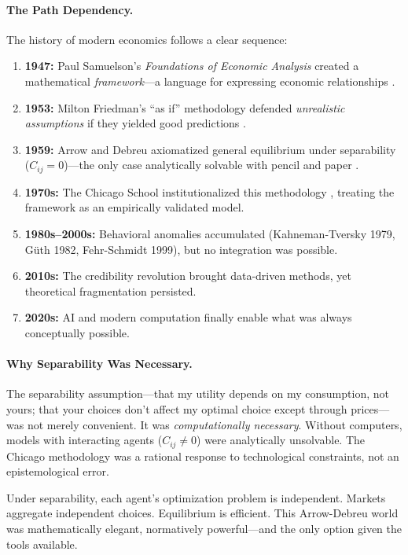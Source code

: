 \paragraph{The Path Dependency.}
The history of modern economics follows a clear sequence:
\begin{enumerate}
    \item \textbf{1947:} Paul Samuelson's \emph{Foundations of Economic Analysis} created a mathematical \emph{framework}---a language for expressing economic relationships \citep{samuelson1947foundations}.
    \item \textbf{1953:} Milton Friedman's ``as if'' methodology defended \emph{unrealistic assumptions} if they yielded good predictions \citep{friedman1953}.
    \item \textbf{1959:} Arrow and Debreu axiomatized general equilibrium under separability ($C_{ij} = 0$)---the only case analytically solvable with pencil and paper \citep{arrowdeb}.
    \item \textbf{1970s:} The Chicago School institutionalized this methodology \citep{stigler1982,becker1976}, treating the framework as an empirically validated model.
    \item \textbf{1980s--2000s:} Behavioral anomalies accumulated (Kahneman-Tversky 1979, Güth 1982, Fehr-Schmidt 1999), but no integration was possible.
    \item \textbf{2010s:} The credibility revolution \citep{angrist2010,leamer2010} brought data-driven methods, yet theoretical fragmentation persisted.
    \item \textbf{2020s:} AI and modern computation finally enable what was always conceptually possible.
\end{enumerate}

\paragraph{Why Separability Was Necessary.}
The separability assumption---that my utility depends on my consumption, not yours; that your choices don't affect my optimal choice except through prices---was not merely convenient. It was \emph{computationally necessary}. Without computers, models with interacting agents ($C_{ij} \neq 0$) were analytically unsolvable. The Chicago methodology was a rational response to technological constraints, not an epistemological error.

Under separability, each agent's optimization problem is independent. Markets aggregate independent choices. Equilibrium is efficient. This Arrow-Debreu world was mathematically elegant, normatively powerful---and the only option given the tools available.


